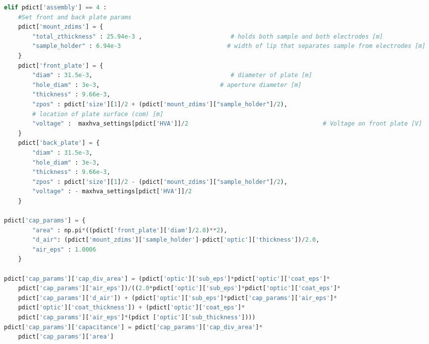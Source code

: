 \begin{spacing}{1.2}
\begin{lstlisting}[frame=single, language=Python]
elif pdict['assembly'] == 4 :
    #Set front and back plate params
    pdict['mount_zdims'] = {
        "total_zthickness" : 25.94e-3 ,                         # holds both sample and both electrodes [m]
        "sample_holder" : 6.94e-3                              # width of lip that separates sample from electrodes [m] 
    }
    pdict['front_plate'] = {
        "diam" : 31.5e-3,                                       # diameter of plate [m]
        "hole_diam" : 3e-3,                                  # aperture diameter [m]
        "thickness" : 9.66e-3, 
        "zpos" : pdict['size'][1]/2 + (pdict['mount_zdims']["sample_holder"]/2),      
	    # location of plate surface (com) [m]
        "voltage" :  maxhva_settings[pdict['HVA']]/2                                      # Voltage on front plate [V]
    }
    pdict['back_plate'] = {
        "diam" : 31.5e-3,
        "hole_diam" : 3e-3,
        "thickness" : 9.66e-3, 
        "zpos" : pdict['size'][1]/2 - (pdict['mount_zdims']["sample_holder"]/2),
        "voltage" : - maxhva_settings[pdict['HVA']]/2 
    }
    
pdict['cap_params'] = {
        "area" : np.pi*((pdict['front_plate']['diam']/2.0)**2), 
        "d_air": (pdict['mount_zdims']['sample_holder']-pdict['optic']['thickness'])/2.0, 
        "air_eps" : 1.0006
    }

pdict['cap_params']['cap_div_area'] = (pdict['optic']['sub_eps']*pdict['optic']['coat_eps']*
    pdict['cap_params']['air_eps'])/((2.0*pdict['optic']['sub_eps']*pdict['optic']['coat_eps']*
    pdict['cap_params']['d_air']) + (pdict['optic']['sub_eps']*pdict['cap_params']['air_eps']*
    pdict['optic']['coat_thickness']) + (pdict['optic']['coat_eps']*
    pdict['cap_params']['air_eps']*(pdict ['optic']['sub_thickness'])))
pdict['cap_params']['capacitance'] = pdict['cap_params']['cap_div_area']*
    pdict['cap_params']['area']


\end{lstlisting}
\end{spacing}
